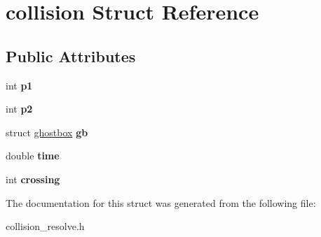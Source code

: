 \hypertarget{structcollision}{
\section{collision Struct Reference}
\label{structcollision}
}
\subsection*{Public Attributes}
\begin{DoxyCompactItemize}
\item 
\hypertarget{structcollision_a493adcb1f84fc10328d0cbe6a1a6de29}{
int {\bfseries p1}}
\label{structcollision_a493adcb1f84fc10328d0cbe6a1a6de29}

\item 
\hypertarget{structcollision_a756aa40e6bfe8384753c9b02d644cca9}{
int {\bfseries p2}}
\label{structcollision_a756aa40e6bfe8384753c9b02d644cca9}

\item 
\hypertarget{structcollision_a907df4c54ef7641652d439fee3a861ad}{
struct \hyperlink{structghostbox}{ghostbox} {\bfseries gb}}
\label{structcollision_a907df4c54ef7641652d439fee3a861ad}

\item 
\hypertarget{structcollision_a36135b63977ab989f4a3c2393d1a1db1}{
double {\bfseries time}}
\label{structcollision_a36135b63977ab989f4a3c2393d1a1db1}

\item 
\hypertarget{structcollision_ae1c4e107265d6fd559a3c81b4404d33f}{
int {\bfseries crossing}}
\label{structcollision_ae1c4e107265d6fd559a3c81b4404d33f}

\end{DoxyCompactItemize}


The documentation for this struct was generated from the following file:\begin{DoxyCompactItemize}
\item 
collision\_\-resolve.h\end{DoxyCompactItemize}
